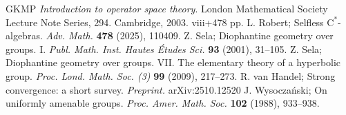 \documentclass[12pt,nosumlimits,nonamelimits]{amsart}
\theoremstyle{remark}
\theoremstyle{definition}
\begin{document}
\begin{thebibliography}{GKMP}
\emph{Introduction to operator space theory}. 
London Mathematical Society Lecture Note Series, 294. 
Cambridge, 2003. viii+478 pp.
%
 L. Robert; 
Selfless $\mathrm{C}^*$-alge\-bras. 
\emph{Adv. Math.} \textbf{478} (2025), 110409.
%
 Z. Sela;
Diophantine geometry over groups. I. 
\emph{Publ. Math. Inst. Hautes \'Etudes Sci.} \textbf{93} (2001), 31--105.
%
 Z. Sela; 
Diophantine geometry over groups. VII. The elementary theory of a hyperbolic group. 
\emph{Proc. Lond. Math. Soc. (3)} \textbf{99} (2009), 217--273.
%
 R. van Handel;
Strong convergence: a short survey.
\emph{Preprint.} arXiv:2510.12520
%
 J. Wysocza\'{n}ski;
On uniformly amenable groups.
\emph{Proc. Amer. Math. Soc.} \textbf{102} (1988), 933--938.
%
\end{thebibliography}
\end{document}
